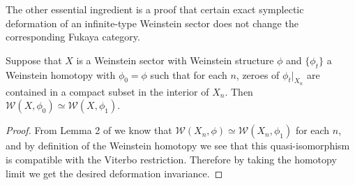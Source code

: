 The other essential ingredient is a proof that certain exact symplectic deformation of an infinite-type Weinstein sector does not change the corresponding Fukaya category.
\begin{prp}\label{prp:deformation-invariance-Fukaya}
    Suppose that $X$ is a Weinstein sector with Weinstein structure $\phi$ and $\{\phi_t\}$ a Weinstein homotopy with $\phi_0=\phi$ such that for each $n$, zeroes of $\phi_t\vert_{X_n}$ are contained in a compact subset in the interior of $X_n$. Then $\mathcal{W} (X,\phi_0)\simeq\mathcal{W} (X,\phi_1)$.
\end{prp}
\begin{proof}
    From Lemma 2 of \cite{Jeffs22} we know that $\mathcal{W} (X_n,\phi)\simeq\mathcal{W} (X_n,\phi_1)$ for each $n$, and by definition of the Weinstein homotopy we see that this quasi-isomorphism is compatible with the Viterbo restriction. Therefore by taking the homotopy limit we get the desired deformation invariance.
\end{proof}
